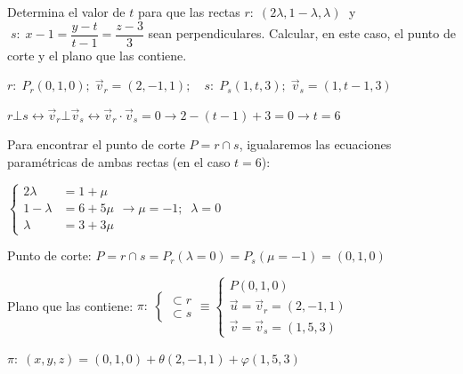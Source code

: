 \begin{ejre}
	Determina el valor de $t$ para que las rectas $r:\; (2\lambda, 1-\lambda,\lambda)\;$ y $\;s:\;x-1=\dfrac{y-t}{t-1}=\dfrac{z-3}{3}$  sean perpendiculares. Calcular, en este caso, el punto de corte y el plano que las contiene.
\end{ejre}
\begin{proofw}\renewcommand{\qedsymbol}{$\diamond$}	
\noindent $r:\; P_r(0,1,0);\; \vec v_r=(2,-1,1);\quad s:\; P_s(1,t,3);\; \vec v_s=(1,t-1,3)$

\noindent $r\bot s \leftrightarrow \vec v_r \bot \vec v_s \leftrightarrow \vec v_r \cdot \vec v_s=0 \to 2-(t-1)+3=0 \to t=6$

\noindent Para encontrar el punto de corte $P=r\cap s$, igualaremos las ecuaciones paramétricas de ambas rectas (en el caso $t=6$):

\noindent $\begin{cases}  2\lambda &=1+\mu  \\ 1-\lambda &= 6+5\mu \\ \lambda &=3+3\mu  \end{cases}  \to \mu=-1;\;\; \lambda=0$

\noindent Punto de corte: $P=r \cap s = P_r(\lambda=0) = P_s(\mu=-1) =(0,1,0)$

\noindent Plano que las contiene: $\pi:\; \begin{cases} \subset r \\ \subset s \end{cases} \equiv \begin{cases} P(0,1,0) \\ \vec u=\vec v_r=(2,-1,1) \\ \vec v=\vec v_s=(1,5,3) \end{cases}$

\noindent $\pi:\; (x,y,z)=(0,1,0)+\theta (2,-1,1)+\varphi (1,5,3)$
\end{proofw}


